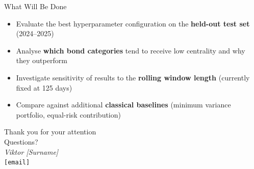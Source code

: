 \documentclass[aspectratio=169]{beamer}
\begin{document}
\begin{frame}{What Will Be Done}
    \begin{itemize}
        \setlength\itemsep{0.8em}
        \item Evaluate the best hyperparameter configuration on the
              \textbf{held-out test set} (2024--2025)
        \item Analyse \textbf{which bond categories} tend to receive low centrality
              and why they outperform
        \item Investigate sensitivity of results to the \textbf{rolling window length}
              (currently fixed at 125 days)
        \item Compare against additional \textbf{classical baselines}
              (minimum variance portfolio, equal-risk contribution)
    \end{itemize}
\end{frame}

\begin{frame}
    \begin{center}
        \vspace{2em}
        {\Large Thank you for your attention}\\[1.5em]
        {\large Questions?}\\[2em]
        \textit{Viktor [Surname]}\\
        \texttt{[email]}
    \end{center}
\end{frame}
\end{document}
